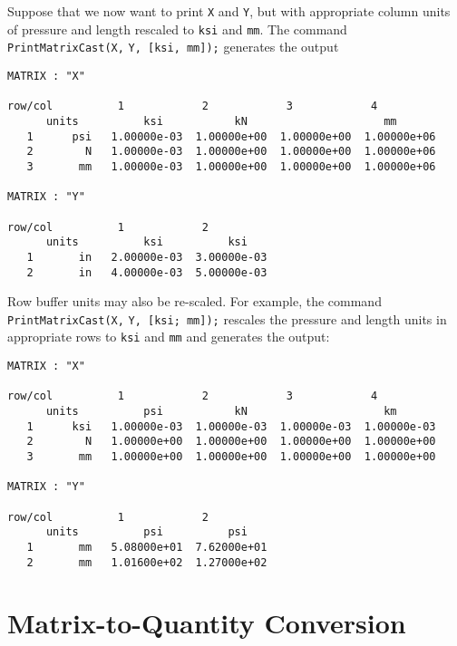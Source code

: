 \vspace{0.15 in}\noindent
Suppose that we now want to print {\tt X} and {\tt Y}, but with appropriate
column units of pressure and length rescaled to {\tt ksi} and {\tt mm}.
The command {\tt PrintMatrixCast(X,} {\tt Y, [ksi, mm]);} generates
the output

\begin{footnotesize}
\begin{verbatim}
MATRIX : "X"

row/col          1            2            3            4          
      units          ksi           kN                     mm   
   1      psi   1.00000e-03  1.00000e+00  1.00000e+00  1.00000e+06
   2        N   1.00000e-03  1.00000e+00  1.00000e+00  1.00000e+06
   3       mm   1.00000e-03  1.00000e+00  1.00000e+00  1.00000e+06

MATRIX : "Y"

row/col          1            2          
      units          ksi          ksi   
   1       in   2.00000e-03  3.00000e-03
   2       in   4.00000e-03  5.00000e-03
\end{verbatim}
\end{footnotesize}

\vspace{0.15 in}\noindent
Row buffer units may also be re-scaled.
For example, the command {\tt PrintMatrixCast(X,} {\tt Y, [ksi; mm]);}
rescales the pressure and length units in appropriate rows to
{\tt ksi} and {\tt mm} and generates the output:

\begin{footnotesize}
\begin{verbatim}
MATRIX : "X"

row/col          1            2            3            4          
      units          psi           kN                     km   
   1      ksi   1.00000e-03  1.00000e-03  1.00000e-03  1.00000e-03
   2        N   1.00000e+00  1.00000e+00  1.00000e+00  1.00000e+00
   3       mm   1.00000e+00  1.00000e+00  1.00000e+00  1.00000e+00

MATRIX : "Y"

row/col          1            2          
      units          psi          psi   
   1       mm   5.08000e+01  7.62000e+01
   2       mm   1.01600e+02  1.27000e+02
\end{verbatim}
\end{footnotesize}

\section{Matrix-to-Quantity Conversion}

